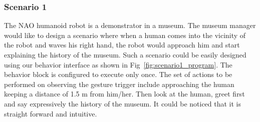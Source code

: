 \documentclass{llncs}
\begin{document}
\subsubsection{Scenario 1}%
The NAO humanoid robot is a demonstrator in a museum. The museum manager would like to design a scenario where when a human comes into the vicinity of the robot and waves his right hand, the robot would approach him and start explaining the history of the museum. Such a scenario could be easily designed using our behavior interface as shown in Fig~\ref{fig:scenario1_program}. The behavior block is configured to execute only once. The set of actions to be performed on observing the gesture trigger include approaching the human keeping a distance of 1.5 m from him/her. Then look at the human, greet first and say expressively the  history of the museum. It could be noticed that it is straight forward and intuitive.%
\end{document}
